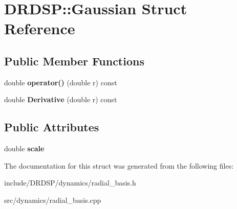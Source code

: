 \hypertarget{struct_d_r_d_s_p_1_1_gaussian}{\section{D\-R\-D\-S\-P\-:\-:Gaussian Struct Reference}
\label{struct_d_r_d_s_p_1_1_gaussian}
}
\subsection*{Public Member Functions}
\begin{DoxyCompactItemize}
\item 
\hypertarget{struct_d_r_d_s_p_1_1_gaussian_aff703aa9e683cce46f56a41d173d2643}{double {\bfseries operator()} (double r) const }\label{struct_d_r_d_s_p_1_1_gaussian_aff703aa9e683cce46f56a41d173d2643}

\item 
\hypertarget{struct_d_r_d_s_p_1_1_gaussian_a9ae975cdc5b2bbc1ae2e1c3725f48890}{double {\bfseries Derivative} (double r) const }\label{struct_d_r_d_s_p_1_1_gaussian_a9ae975cdc5b2bbc1ae2e1c3725f48890}

\end{DoxyCompactItemize}
\subsection*{Public Attributes}
\begin{DoxyCompactItemize}
\item 
\hypertarget{struct_d_r_d_s_p_1_1_gaussian_a54c0ec40d9295e0167e6216912f01d2a}{double {\bfseries scale}}\label{struct_d_r_d_s_p_1_1_gaussian_a54c0ec40d9295e0167e6216912f01d2a}

\end{DoxyCompactItemize}


The documentation for this struct was generated from the following files\-:\begin{DoxyCompactItemize}
\item 
include/\-D\-R\-D\-S\-P/dynamics/radial\-\_\-basis.\-h\item 
src/dynamics/radial\-\_\-basis.\-cpp\end{DoxyCompactItemize}
